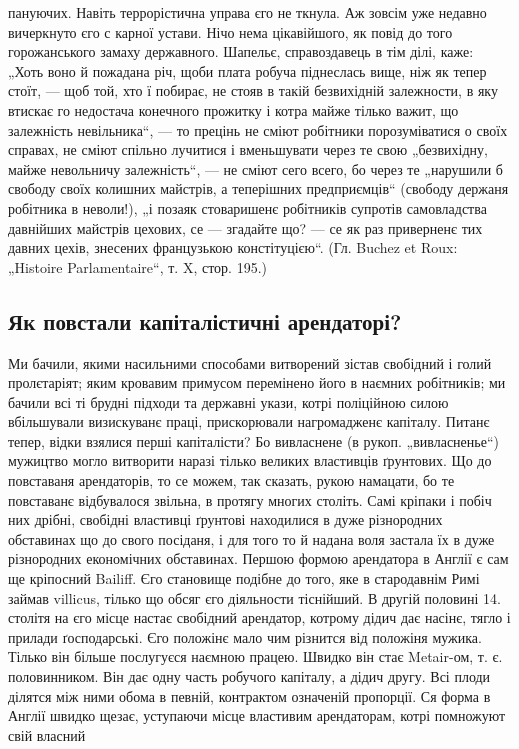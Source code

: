 \parcont{}
пануючих. Навіть террорістична управа єго не ткнула. Аж
зовсім уже недавно вичеркнуто єго с карної устави. Нічо
нема цікавійшого, як повід до того горожанського замаху
державного. Шапельє, справоздавець в тім ділі, каже: „Хоть
воно й пожадана річ, щоби плата робуча піднеслась вище,
ніж як тепер стоїт, — щоб той, хто ї побирає, не стояв
в такій безвихідній залежности, в яку втискає го недостача
конечного прожитку і котра майже тілько важит, що залежність
невільника“, — то прецінь не сміют робітники
порозуміватися о своїх справах, не сміют спільно лучитися
і вменьшувати через те свою „безвихідну, майже невольничу
залежність“, — не сміют сего всего, бо через те „нарушили б
свободу своїх колишних майстрів, а теперішних
предприємців“ (свободу держаня робітника в неволи!), „і позаяк
стоваришенє робітників супротів самовладства давнійших
майстрів цехових, се — згадайте що? — се як раз приверненє
тих давних цехів, знесених французькою констітуцією“.
(Гл. Buchez et Roux: „Histoire Parlamentaire“, т. X,
стор. 195.)

\subsection{Як повстали капіталістичні арендаторі?}

Ми бачили, якими насильними способами витворений
зістав свобідний і голий пролєтаріят; яким кровавим примусом
перемінено його в наємних робітників; ми бачили всі
ті брудні підходи та державні укази, котрі поліційною силою
вбільшували визискуванє праці, прискорювали нагромадженє
капіталу. Питанє тепер, відки взялися перші капіталісти?
Бо вивласнене (в рукоп. „вивласненье“) мужицтво
могло витворити наразі тілько великих властивців ґрунтових.
Що до повставаня арендаторів, то се можем, так сказать, рукою
намацати, бо те повставанє відбувалося звільна, в протягу
многих століть. Самі кріпаки і побіч них дрібні, свобідні
властивці ґрунтові находилися в дуже різнородних обставинах
що до свого посіданя, і для того то й надана воля
застала їх в дуже різнородних економічних обставинах.
Першою формою арендатора в Англії є сам ще кріпосний
Bailiff. Єго становище подібне до того, яке в стародавнім
Римі займав villicus, тілько що обсяг єго діяльности тіснійший.
В другій половині 14. столітя на єго місце настає свобідний
арендатор, котрому дідич дає насінє, тягло і прилади
ґосподарські. Єго положінє мало чим різнится від
положіня мужика. Тілько він більше послугуєся наємною
працею. Швидко він стає Metair-ом, т. є. половинником. Він
дає одну часть робучого капіталу, а дідич другу. Всі плоди
ділятся між ними обома в певній, контрактом означеній
пропорції. Ся форма в Англії швидко щезає, уступаючи
місце властивим арендаторам, котрі помножуют свій власний
\parbreak{}
